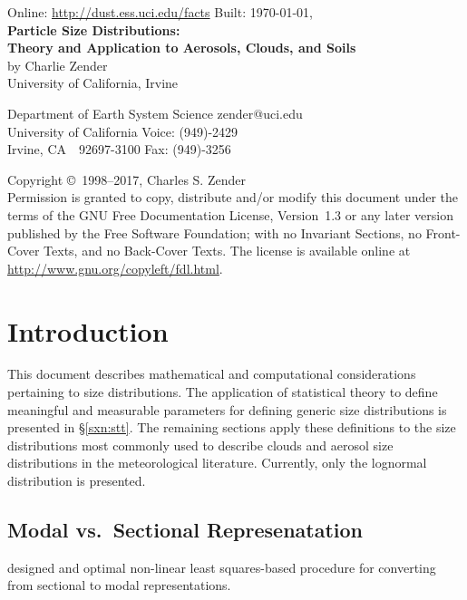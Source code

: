 \documentclass[12pt,twoside]{article}
\begin{document}

\begin{center}
Online: \url{http://dust.ess.uci.edu/facts} \hfill Built: \shortdate\today, \xxivtime\\
\bigskip
{\Large \textbf{Particle Size Distributions:\\ 
Theory and Application to Aerosols, Clouds, and Soils}}\\
\bigskip
by Charlie Zender\\
University of California, Irvine\\
\end{center}
Department of Earth System Science \hfill zender@uci.edu\\
University of California \hfill Voice: (949)-2429\\
Irvine, CA~~92697-3100 \hfill Fax: (949)-3256

\bigskip\noindent
Copyright \copyright\ 1998--2017,  Charles S. Zender\\
Permission is granted to copy, distribute and/or modify this document
under the terms of the GNU Free Documentation License, Version~1.3
or any later version published by the Free Software Foundation;
with no Invariant Sections, no Front-Cover Texts, and no Back-Cover
Texts.
The license is available online at
\url{http://www.gnu.org/copyleft/fdl.html}.

\setcounter{page}{1}
\pagestyle{headings}
\thispagestyle{empty}
\tableofcontents
\listoftables
{}
\setcounter{page}{1}
\thispagestyle{empty}

\section{Introduction}\label{sxn:ntr}

This document describes mathematical and computational considerations 
pertaining to size distributions.
The application of statistical theory to define meaningful and
measurable parameters for defining generic size distributions is
presented in \S\ref{sxn:stt}.
The remaining sections apply these definitions to the size
distributions most commonly used to describe clouds and aerosol size
distributions in the meteorological literature.
Currently, only the lognormal distribution is presented.

\subsection[Modal vs.\ Sectional Represenatation]{Modal vs.\ Sectional Represenatation}
\cite{LuB04} designed and optimal non-linear least squares-based
procedure for converting from sectional to modal representations.
\end{document}
